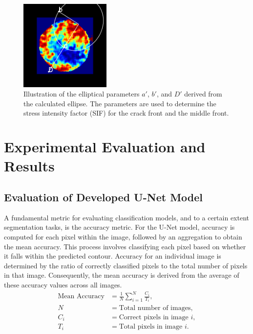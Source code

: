 \documentclass{ieeeaccess}
\begin{document}
\begin{figure}[!t]
    \centering
    \includegraphics[width=0.4\textwidth]{figures/ellipse_parameters.png}
    \caption{Illustration of the elliptical parameters \(a'\), \(b'\), and \(D'\) derived from the calculated ellipse. The parameters are used to determine the stress intensity factor (SIF) for the crack front and the middle front.}
    \label{fig:ellipse_parameters}
\end{figure}


\section{Experimental Evaluation and Results} 
\label{sec:Experimental Evaluation and Results}

\subsection{Evaluation of Developed U-Net Model}
\label{subsec: Evaluation of Developed U-Net Mode}
A fundamental metric for evaluating classification models, and to a certain extent segmentation tasks, is the accuracy metric. For the U-Net model, accuracy is computed for each pixel within the image, followed by an aggregation to obtain the mean accuracy. This process involves classifying each pixel based on whether it falls within the predicted contour. Accuracy for an individual image is determined by the ratio of correctly classified pixels to the total number of pixels in that image. Consequently, the mean accuracy is derived from the average of these accuracy values across all images.
\begin{align*}
\text{Mean Accuracy} & = \frac{1}{N} \sum_{i=1}^{N} \frac{C_i}{T_i}, \\
N & = \text{Total number of images}, \\
C_i & = \text{Correct pixels in image } i, \\
T_i & = \text{Total pixels in image } i.
\end{align*}
\end{document}
